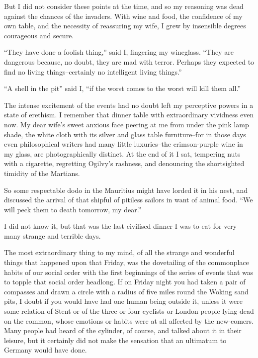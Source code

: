 But I did not consider these points at the time, and so my
reasoning was dead against the chances of the invaders. With wine
and food, the confidence of my own table, and the necessity of
reassuring my wife, I grew by insensible degrees courageous and
secure.

``They have done a foolish thing,'' said I, fingering my wineglass.
``They are dangerous because, no doubt, they are mad with terror.
Perhaps they expected to find no living things--certainly no
intelligent living things.''

``A shell in the pit'' said I, ``if the worst comes to the worst will
kill them all.''

The intense excitement of the events had no doubt left my
perceptive powers in a state of erethism. I remember that dinner
table with extraordinary vividness even now. My dear wife's sweet
anxious face peering at me from under the pink lamp shade, the
white cloth with its silver and glass table furniture--for in those
days even philosophical writers had many little luxuries--the
crimson-purple wine in my glass, are photographically distinct. At
the end of it I sat, tempering nuts with a cigarette, regretting
Ogilvy's rashness, and denouncing the shortsighted timidity of the
Martians.

So some respectable dodo in the Mauritius might have lorded it in
his nest, and discussed the arrival of that shipful of pitiless
sailors in want of animal food. ``We will peck them to death
tomorrow, my dear.''

I did not know it, but that was the last civilised dinner I was to
eat for very many strange and terrible days.

The most extraordinary thing to my mind, of all the strange and
wonderful things that happened upon that Friday, was the
dovetailing of the commonplace habits of our social order with the
first beginnings of the series of events that was to topple that
social order headlong. If on Friday night you had taken a pair of
compasses and drawn a circle with a radius of five miles round the
Woking sand pits, I doubt if you would have had one human being
outside it, unless it were some relation of Stent or of the three
or four cyclists or London people lying dead on the common, whose
emotions or habits were at all affected by the new-comers. Many
people had heard of the cylinder, of course, and talked about it in
their leisure, but it certainly did not make the sensation that an
ultimatum to Germany would have done.

